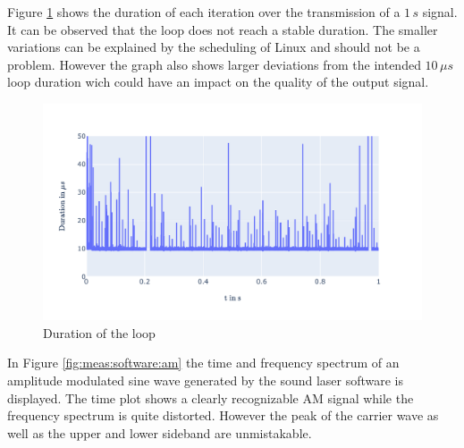 Figure \ref{fig:meas:software:duration} shows the duration of each iteration over the transmission of a $1\,s$ signal. It can be observed that the loop does not reach a stable duration. The smaller variations can be explained by the scheduling of Linux and should not be a problem. However the graph also shows larger deviations from the intended $10\,\mu s$ loop duration wich could have an impact on the quality of the output signal.
%
\begin{figure}[ht]
  \centering
  \includegraphics[height=\mediumheight]{src/assets/pictures/measurements/software_duration.pdf}
  \caption{Duration of the loop}\label{fig:meas:software:duration}
\end{figure}
\newpage\noindent
In Figure \ref{fig:meas:software:am} the time and frequency spectrum of an amplitude modulated sine wave generated by the sound laser software is displayed. The time plot shows a clearly recognizable AM signal while the frequency spectrum is quite distorted. However the peak of the carrier wave as well as the upper and lower sideband are unmistakable.
%
